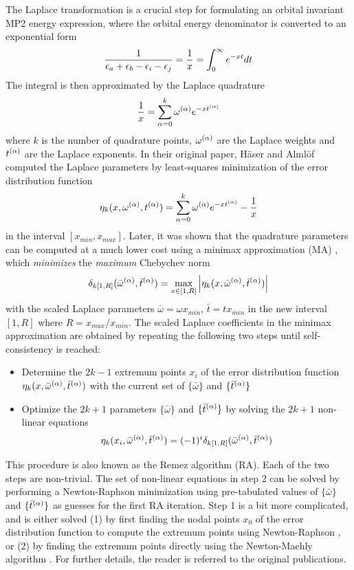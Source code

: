 The Laplace transformation is  a crucial step for formulating an orbital invariant MP2 energy expression, where the orbital energy denominator is converted to an exponential form 
\begin{equation}
\frac{1}{\epsilon_a + \epsilon_b - \epsilon_i - \epsilon_j } = \frac{1}{x} = \int_0^{\infty} e^{-xt} dt
\end{equation} 
\noindent The integral is then approximated by the Laplace quadrature
\begin{equation}
\frac{1}{x} = \sum_{\alpha = 0}^{k} \omega^{(\alpha)} e^{-xt^{(\alpha)}}  
\end{equation}
\noindent where $k$ is the number of quadrature points, $\omega^{(\alpha)}$ are the Laplace weights and $t^{(\alpha)}$ are the Laplace exponents. In their original paper, Häser and Almlöf \cite{Has1992} computed the Laplace parameters by least-squares minimization of the error distribution function
\begin{equation}
\eta_k (x,\omega^{(\alpha)},t^{(\alpha)}) = \sum_{\alpha = 0}^k \omega^{(\alpha)} e^{-xt^{(\alpha)}} - \frac{1}{x}
\end{equation}
\noindent in the interval $[x_{min},x_{max}]$. Later, it was shown that the quadrature parameters can be computed at a much lower cost using a minimax approximation (MA) \cite{Tak2008}, which \emph{minimizes} the \emph{maximum} Chebychev norm
\begin{equation}
\delta_{k[1,R]}(\bar{\omega}^{(\alpha)},\bar{t}^{(\alpha)}) = \max_{x \in [1,R]} \left\lvert \eta_k (x,\bar{\omega}^{(\alpha)},\bar{t}^{(\alpha)} ) \right\rvert 
\end{equation}
\noindent with the scaled Laplace parameters $\bar{\omega} = \omega x_{min}$, $\bar{t} = t x_{min}$  in the new interval $[1,R]$ where $R = x_{max}/x_{min}$. The scaled Laplace coefficients in the minimax approximation are obtained by repeating the following two steps until self-consistency is reached:
\begin{itemize}
\item Determine the $2k-1$ extremum points $x_i$ of the error distribution function $\eta_k (x,\bar{\omega}^{(\alpha)},\bar{t}^{(\alpha)})$ with the current set of $\{\bar{\omega}\}$ and $\{\bar{t}^{(\alpha)}\}$
\item Optimize the $2k+1$ parameters $\{\bar{\omega}\}$ and $\{\bar{t}^{(\alpha)}\}$ by solving the $2k+1$ non-linear equations
\begin{equation}
\eta_k (x_i,\bar{\omega}^{(\alpha)},\bar{t}^{(\alpha)}) = (-1)^i \delta_{k[1,R]}(\bar{\omega}^{(\alpha)},\bar{t}^{(\alpha)})
\end{equation} 
\end{itemize}
\noindent This procedure is also known as the Remez algorithm (RA). Each of the two steps are non-trivial. The set of non-linear equations in step 2 can be solved by performing a Newton-Raphson minimization using pre-tabulated values of $\{\bar{\omega}\}$ and $\{\bar{t}^{(\alpha)}\}$ as guesses for the first RA iteration. Step 1 is a bit more complicated, and is either solved (1) by first finding the nodal points $x_0$ of the error distribution function to compute the extremum points using Newton-Raphson \cite{Tak2008}, or (2) by finding the extremum points directly using the Newton-Maehly algorithm \cite{Hel2016}. For further details, the reader is referred to the original publications.


